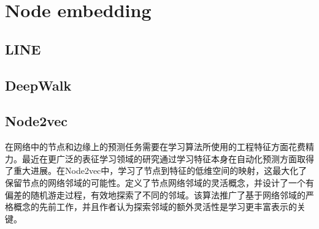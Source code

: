 \documentclass{article}
\begin{document}
\section{Node embedding}

\subsection{LINE}

\subsection{DeepWalk}

\subsection{Node2vec}
在网络中的节点和边缘上的预测任务需要在学习算法所使用的工程特征方面花费精力。最近在更广泛的表征学习领域的研究通过学习特征本身在自动化预测方面取得了重大进展。在Node2vec中，学习了节点到特征的低维空间的映射，这最大化了保留节点的网络邻域的可能性。定义了节点网络邻域的灵活概念，并设计了一个有偏差的随机游走过程，有效地探索了不同的邻域。该算法推广了基于网络邻域的严格概念的先前工作，并且作者认为探索邻域的额外灵活性是学习更丰富表示的关键。
\end{document}
